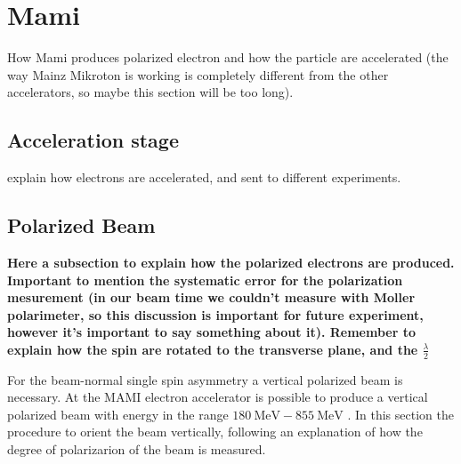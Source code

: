 \begin{figure}[hbtp]
\centering
{} \quad
{} \quad
\end{figure}


\section{Mami}
How Mami produces polarized electron and how the particle are accelerated (the way Mainz Mikroton is working is completely different from the other accelerators, so maybe this section will be too long).

\subsection{Acceleration stage}
explain how electrons are accelerated, and sent to different experiments.

\subsection{Polarized Beam}
{\bfseries Here a subsection to explain how the polarized electrons are produced. Important to mention the systematic error for the polarization mesurement (in our beam time we couldn't measure with Moller polarimeter, so this discussion is important for future experiment, however it's important to say something about it). Remember to explain how the spin are rotated to the transverse plane, and the $\frac{\lambda}{2}$}

For the beam-normal single spin asymmetry a vertical polarized beam is necessary. At the MAMI electron accelerator is possible to produce a vertical polarized beam with energy in the range $\SI{180}{\mega \electronvolt} - \SI{855}{\mega \electronvolt}$ \cite{Schlimme_2017}. In this section the procedure to orient the beam vertically, following an explanation of how the degree of polarizarion of the beam is measured.

